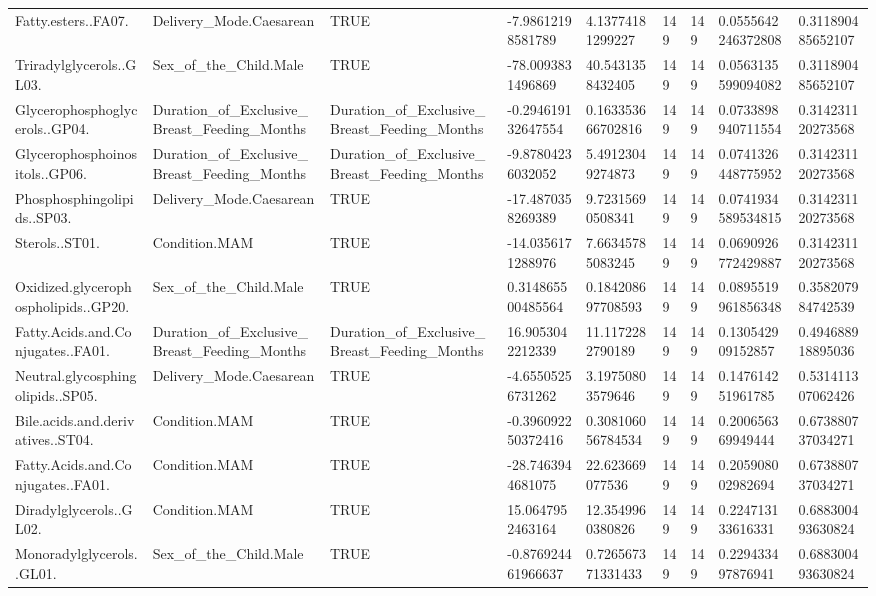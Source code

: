 \begin{longtable}{lllllllll}
Fatty.esters..FA07. & Delivery\_Mode.Caesarean & TRUE & -7.98612198581789 & 4.13774181299227 & 149 & 149 & 0.0555642246372808 & 0.311890485652107 \\
Triradylglycerols..GL03. & Sex\_of\_the\_Child.Male & TRUE & -78.0093831496869 & 40.5431358432405 & 149 & 149 & 0.0563135599094082 & 0.311890485652107 \\
Glycerophosphoglycerols..GP04. & Duration\_of\_Exclusive\_Breast\_Feeding\_Months & Duration\_of\_Exclusive\_Breast\_Feeding\_Months & -0.294619132647554 & 0.163353666702816 & 149 & 149 & 0.0733898940711554 & 0.314231120273568 \\
Glycerophosphoinositols..GP06. & Duration\_of\_Exclusive\_Breast\_Feeding\_Months & Duration\_of\_Exclusive\_Breast\_Feeding\_Months & -9.87804236032052 & 5.49123049274873 & 149 & 149 & 0.0741326448775952 & 0.314231120273568 \\
Phosphosphingolipids..SP03. & Delivery\_Mode.Caesarean & TRUE & -17.4870358269389 & 9.72315690508341 & 149 & 149 & 0.0741934589534815 & 0.314231120273568 \\
Sterols..ST01. & Condition.MAM & TRUE & -14.0356171288976 & 7.66345785083245 & 149 & 149 & 0.0690926772429887 & 0.314231120273568 \\
Oxidized.glycerophospholipids..GP20. & Sex\_of\_the\_Child.Male & TRUE & 0.314865500485564 & 0.184208697708593 & 149 & 149 & 0.0895519961856348 & 0.358207984742539 \\
Fatty.Acids.and.Conjugates..FA01. & Duration\_of\_Exclusive\_Breast\_Feeding\_Months & Duration\_of\_Exclusive\_Breast\_Feeding\_Months & 16.9053042212339 & 11.1172282790189 & 149 & 149 & 0.130542909152857 & 0.494688918895036 \\
Neutral.glycosphingolipids..SP05. & Delivery\_Mode.Caesarean & TRUE & -4.65505256731262 & 3.19750803579646 & 149 & 149 & 0.147614251961785 & 0.531411307062426 \\
Bile.acids.and.derivatives..ST04. & Condition.MAM & TRUE & -0.396092250372416 & 0.308106056784534 & 149 & 149 & 0.200656369949444 & 0.673880737034271 \\
Fatty.Acids.and.Conjugates..FA01. & Condition.MAM & TRUE & -28.7463944681075 & 22.623669077536 & 149 & 149 & 0.205908002982694 & 0.673880737034271 \\
Diradylglycerols..GL02. & Condition.MAM & TRUE & 15.0647952463164 & 12.3549960380826 & 149 & 149 & 0.224713133616331 & 0.688300493630824 \\
Monoradylglycerols..GL01. & Sex\_of\_the\_Child.Male & TRUE & -0.876924461966637 & 0.726567371331433 & 149 & 149 & 0.229433497876941 & 0.688300493630824 \\

\end{longtable}
